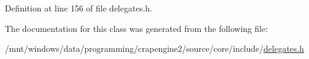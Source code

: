 Definition at line 156 of file delegates.\+h.



The documentation for this class was generated from the following file\+:\begin{DoxyCompactItemize}
\item 
/mnt/windows/data/programming/crapengine2/source/core/include/\hyperlink{delegates_8h}{delegates.\+h}\end{DoxyCompactItemize}
